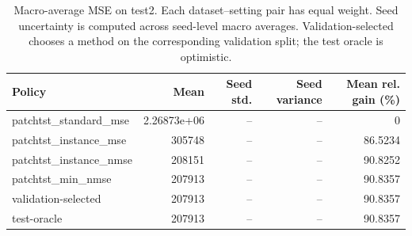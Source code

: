 \begin{table}[htbp]
\centering
\caption{Macro-average MSE on test2. Each dataset--setting pair has equal weight. Seed uncertainty is computed across seed-level macro averages. Validation-selected chooses a method on the corresponding validation split; the test oracle is optimistic.}
\begin{tabular}{lrrrr}
\toprule
Policy & Mean & Seed std. & Seed variance & Mean rel. gain (\%) \\
\midrule
patchtst\_standard\_mse & 2.26873e+06 & -- & -- & 0 \\
patchtst\_instance\_mse & 305748 & -- & -- & 86.5234 \\
patchtst\_instance\_nmse & 208151 & -- & -- & 90.8252 \\
patchtst\_min\_nmse & 207913 & -- & -- & 90.8357 \\
validation-selected & 207913 & -- & -- & 90.8357 \\
\midrule
test-oracle & 207913 & -- & -- & 90.8357 \\
\bottomrule
\end{tabular}
\end{table}

